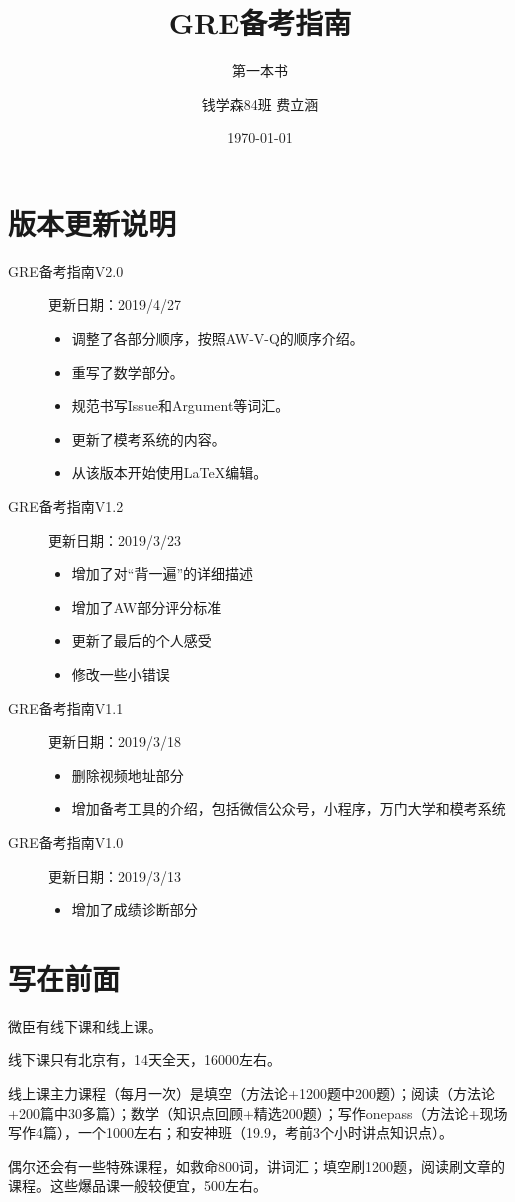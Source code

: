 \documentclass[cn,plain]{./src/qyxfbook}
\title{GRE备考指南}
\subtitle{第一本书}
\author{钱学森84班 费立涵}
\institute{钱学森学院学业辅导中心}
\date{\today}
\begin{document}
\maketitle
\chapter{版本更新说明}
\begin{description}
	\item[GRE备考指南V2.0] 更新日期：2019/4/27
	\begin{itemize}
		\item 调整了各部分顺序，按照AW-V-Q的顺序介绍。
		\item 重写了数学部分。
		\item 规范书写Issue和Argument等词汇。
		\item 更新了模考系统的内容。
		\item 从该版本开始使用LaTeX编辑。
	\end{itemize}

	\item[GRE备考指南V1.2] 更新日期：2019/3/23
	\begin{itemize}
		\item 增加了对``背一遍''的详细描述
		\item 增加了AW部分评分标准
		\item 更新了最后的个人感受
		\item 修改一些小错误
	\end{itemize}
	\item[GRE备考指南V1.1] 更新日期：2019/3/18
	\begin{itemize}
		\item 删除视频地址部分
		\item 增加备考工具的介绍，包括微信公众号，小程序，万门大学和模考系统
	\end{itemize}
	\item[GRE备考指南V1.0] 更新日期：2019/3/13
	\begin{itemize}
		\item 增加了成绩诊断部分
	\end{itemize}
	
\end{description}
\newpage
\thispagestyle{empty}

\tableofcontents
\clearpage
\thispagestyle{empty}

\hypersetup{pageanchor=true}
	
\chapter{写在前面}
		微臣有线下课和线上课。\par
		线下课只有北京有，14天全天，16000左右。\par
		线上课主力课程（每月一次）是填空（方法论+1200题中200题）；阅读（方法论+200篇中30多篇）；数学（知识点回顾+精选200题）；写作onepass（方法论+现场写作4篇），一个1000左右；和安神班（19.9，考前3个小时讲点知识点）。\par
		偶尔还会有一些特殊课程，如救命800词，讲词汇；填空刷1200题，阅读刷文章的课程。这些爆品课一般较便宜，500左右。
\end{document}
